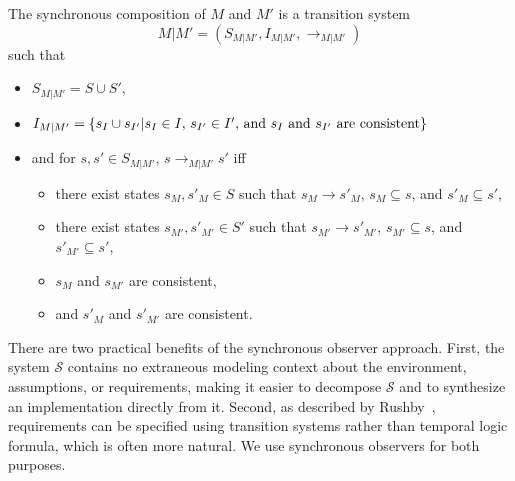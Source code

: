 \documentclass{llncs/llncs}
\begin{document}
\begin{definition}
The synchronous composition of $M$ and $M'$ is a transition system
$$M | M' = (S_{M | M'}, I_{M | M'}, \rightarrow_{M | M'})$$
\noindent
such that
\begin{itemize}
\item $S_{M | M'} = S \cup S'$,
\item $I_{M | M'} = \{ s_I \cup s_{I'} | s_I \in I\textnormal{, }s_{I'} \in I'\textnormal{, and } s_I \textnormal{ and } s_{I'}\textnormal{ are consistent}\}$
\item and for $s, s' \in S_{M | M'}$, $s \rightarrow_{M | M'} s'$ iff
  \begin{itemize}
  \item there exist states $s_M, s'_M \in S$ such that $s_M \rightarrow s'_M$, $s_M \subseteq s$, and $s'_M \subseteq s'$,
  \item there exist states $s_{M'}, s'_{M'} \in S'$ such that $s_{M'} \rightarrow s'_{M'}$, $s_{M'} \subseteq s$, and $s'_{M'} \subseteq s'$,
  \item $s_M$ and $s_{M'}$ are consistent,
  \item and $s'_M$ and $s'_{M'}$ are consistent.
  \end{itemize}
\end{itemize}
\end{definition}




There are two practical benefits of the synchronous observer approach. First, the system $\mathcal{S}$ contains no extraneous modeling context about the environment, assumptions, or requirements, making it easier to decompose $\mathcal{S}$ and to synthesize an implementation directly from it. Second, as described by Rushby~\cite{}, requirements can be specified using transition systems rather than temporal logic formula, which is often more natural. We use synchronous observers for both purposes.
\end{document}
